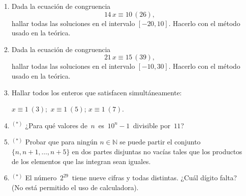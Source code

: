 \documentclass[a4paper,12pt,twoside,spanish,reqno]{amsbook}
\numberwithin{equation}{section}
\begin{document}
\begin{enumerate}[resume]
\item Dada la ecuación de congruencia
$$14\,x\equiv 10 \, (26),$$
hallar todas las soluciones en el intervalo $[-20,10]$. Hacerlo con el método usado en la teórica.

\item Dada la ecuación de congruencia
$$21\,x\equiv 15 \, (39),$$
hallar todas las soluciones en el intervalo $[-10,30]$. Hacerlo con el método usado en la teórica. 

\item Hallar todos los enteros que satisfacen simultáneamente:

$x \equiv 1\ ( 3); $ \qquad $x \equiv 1 \ ( 5)$; \qquad $x \equiv 1\ ( 7)$.

\item${}^{(*)}$  ¿Para qué valores de \,$n$\, es \,$10^n-1$\, divisible por \,$11$?

\item${}^{(*)}$ Probar que para ning\'un $n\in\mathbb N$ se puede partir el conjunto $\{n,n+1,\ldots, n+5\}$ en dos partes disjuntas no vacías tales que los productos de los elementos que las integran sean iguales.

\item${}^{(*)}$  El número \,$2^{29}$\, tiene nueve cifras y todas distintas.
¿Cuál dígito falta? (No está permitido el uso de calculadora).

\end{enumerate}
\end{document}

